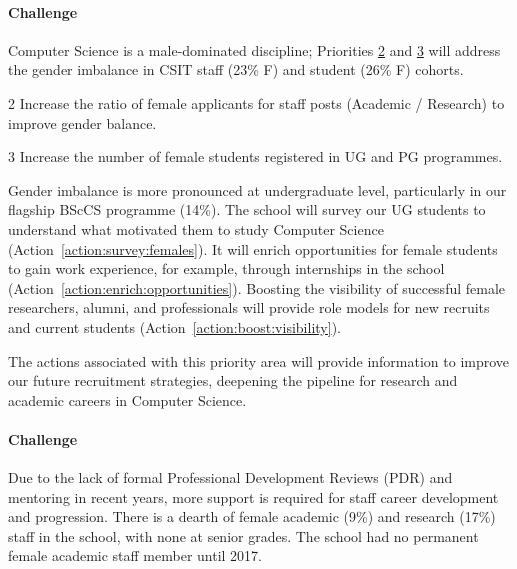 \paragraph{Challenge}
Computer Science is a male-dominated discipline; Priorities \hyperlink{priority:2}{2}  and \hyperlink{priority:3}{3} will address the gender imbalance in CSIT staff (23\% F) and student (26\% F) cohorts.

\begin{priority}{2}
    Increase the ratio of female applicants for staff posts (Academic / Research) to improve gender balance.  
    \hfill{
    \hypersetup{hidelinks}
    \hyperlink{p2}{\gotoactionsymbol{}}
}
\end{priority}



\begin{priority}{3}
    Increase the number of female students registered in UG and PG programmes. 
    \hfill{
    \hypersetup{hidelinks}
    \hyperlink{p3}{\gotoactionsymbol{}}
}
\end{priority}

Gender imbalance is more pronounced at undergraduate level, particularly in our flagship BScCS programme (14\%). The school will survey our UG students to understand what motivated them to study Computer Science (Action~\ref{action:survey:females}). It will enrich opportunities for female students to gain work experience, for example, through internships in the school (Action~\ref{action:enrich:opportunities}). Boosting the visibility of successful female researchers, alumni, and professionals will provide role models for new recruits and current students (Action~\ref{action:boost:visibility}).  

The actions associated with this priority area will provide information to improve our future recruitment strategies, deepening the pipeline for research and academic careers in Computer Science. 

\paragraph{Challenge}
Due to the lack of formal Professional Development Reviews (PDR) and mentoring in recent years, more support is required for staff career development and progression. 
There is a dearth of female academic (9\%) and research (17\%) staff in the school, with none at senior grades.  The school had no permanent female academic staff member until 2017.


